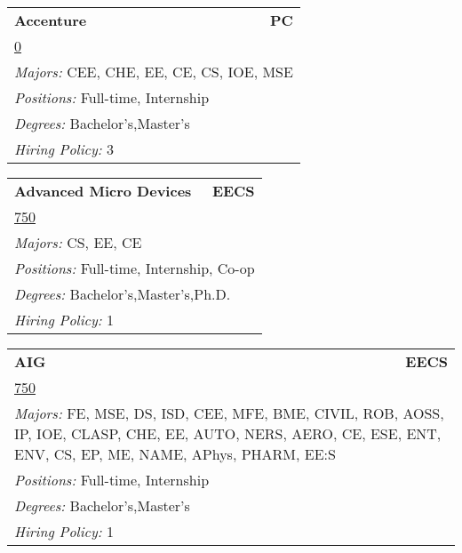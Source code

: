 \documentclass[twoside]{article}
\begin{document}
\begin{center}
\begin{multicols}{3}
\begin{FlushLeft}
\begin{minipage}{\columnwidth}\begin{tabularx}{.95\columnwidth}{Xr}
                 {\Large\bf Accenture} & {\Large\bf PC}\\
    \multicolumn{2}{p{.95\columnwidth}}{\url{0}}\\
    \multicolumn{2}{p{.95\columnwidth}}{\emph{Majors:} CEE, CHE, EE, CE, CS, IOE, MSE}\\
    \multicolumn{2}{p{.95\columnwidth}}{\emph{Positions:} Full-time, Internship}\\
    \multicolumn{2}{p{.95\columnwidth}}{\emph{Degrees:} Bachelor's,Master's}\\
    \multicolumn{2}{p{.95\columnwidth}}{\emph{Hiring Policy:} 3}\\
    \end{tabularx}
    
\end{minipage}
 
\begin{minipage}{\columnwidth}\begin{tabularx}{.95\columnwidth}{Xr}
                 {\Large\bf Advanced Micro Devices} & {\Large\bf EECS}\\
    \multicolumn{2}{p{.95\columnwidth}}{\url{750}}\\
    \multicolumn{2}{p{.95\columnwidth}}{\emph{Majors:} CS, EE, CE}\\
    \multicolumn{2}{p{.95\columnwidth}}{\emph{Positions:} Full-time, Internship, Co-op}\\
    \multicolumn{2}{p{.95\columnwidth}}{\emph{Degrees:} Bachelor's,Master's,Ph.D.}\\
    \multicolumn{2}{p{.95\columnwidth}}{\emph{Hiring Policy:} 1}\\
    \end{tabularx}
    
\end{minipage}
 
\begin{minipage}{\columnwidth}\begin{tabularx}{.95\columnwidth}{Xr}
                 {\Large\bf AIG} & {\Large\bf EECS}\\
    \multicolumn{2}{p{.95\columnwidth}}{\url{750}}\\
    \multicolumn{2}{p{.95\columnwidth}}{\emph{Majors:} FE, MSE, DS, ISD, CEE, MFE, BME, CIVIL, ROB, AOSS, IP, IOE, CLASP, CHE, EE, AUTO, NERS, AERO, CE, ESE, ENT, ENV, CS, EP, ME, NAME, APhys, PHARM, EE:S}\\
    \multicolumn{2}{p{.95\columnwidth}}{\emph{Positions:} Full-time, Internship}\\
    \multicolumn{2}{p{.95\columnwidth}}{\emph{Degrees:} Bachelor's,Master's}\\
    \multicolumn{2}{p{.95\columnwidth}}{\emph{Hiring Policy:} 1}\\
    \end{tabularx}
    

\end{minipage}
\end{FlushLeft}
\end{multicols}
\end{center}
\end{document}
